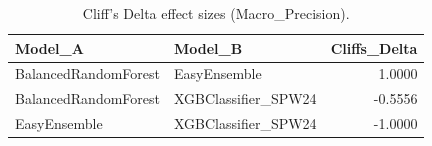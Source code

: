 \begin{table}[t]
\centering
\begin{tabular}{llr}
\toprule
Model_A & Model_B & Cliffs_Delta \\
\midrule
BalancedRandomForest & EasyEnsemble & 1.0000 \\
BalancedRandomForest & XGBClassifier_SPW24 & -0.5556 \\
EasyEnsemble & XGBClassifier_SPW24 & -1.0000 \\
\bottomrule
\end{tabular}
\caption{Cliff's Delta effect sizes (Macro_Precision).}
\label{tab:cliffs_Macro_Precision}
\end{table}